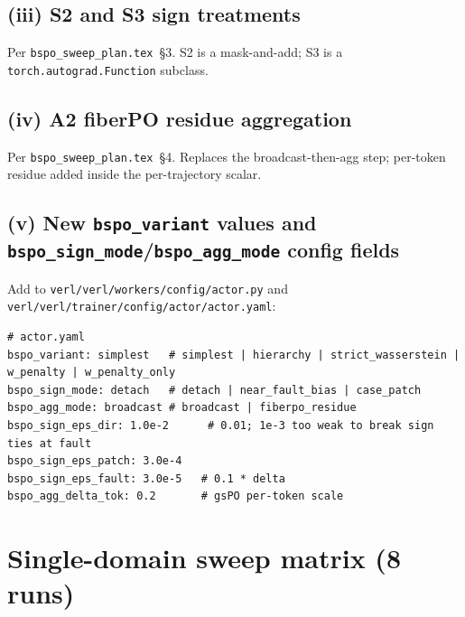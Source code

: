 \documentclass[11pt]{article}
\begin{document}
\subsection*{(iii) S2 and S3 sign treatments}

Per \texttt{bspo\_sweep\_plan.tex}~\S3. S2 is a mask-and-add; S3 is a
\verb|torch.autograd.Function| subclass.

\subsection*{(iv) A2 fiberPO residue aggregation}

Per \texttt{bspo\_sweep\_plan.tex}~\S4. Replaces the broadcast-then-agg
step; per-token residue added inside the per-trajectory scalar.

\subsection*{(v) New \texttt{bspo\_variant} values and \texttt{bspo\_sign\_mode}/\texttt{bspo\_agg\_mode} config fields}

Add to \verb|verl/verl/workers/config/actor.py| and
\verb|verl/verl/trainer/config/actor/actor.yaml|:
\begin{lstlisting}
# actor.yaml
bspo_variant: simplest   # simplest | hierarchy | strict_wasserstein | w_penalty | w_penalty_only
bspo_sign_mode: detach   # detach | near_fault_bias | case_patch
bspo_agg_mode: broadcast # broadcast | fiberpo_residue
bspo_sign_eps_dir: 1.0e-2      # 0.01; 1e-3 too weak to break sign ties at fault
bspo_sign_eps_patch: 3.0e-4
bspo_sign_eps_fault: 3.0e-5   # 0.1 * delta
bspo_agg_delta_tok: 0.2       # gsPO per-token scale
\end{lstlisting}

\section{Single-domain sweep matrix (8 runs)}
\label{sec:sd-matrix}
\end{document}

